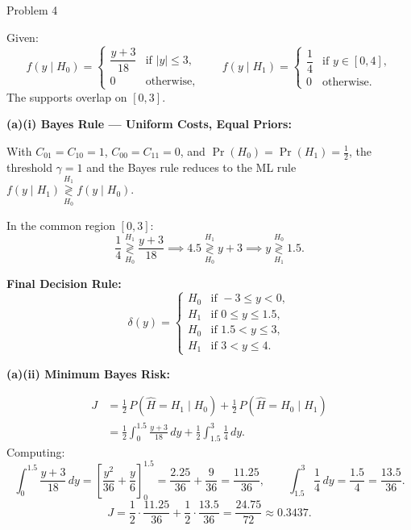 \documentclass[12pt,a4paper,onecolumn]{exam}
\newcommand{\questionheader}[1]{%
  \begin{tcolorbox}[
    enhanced,
    colback=black,
    coltext=white,
    boxrule=0pt,
    fontupper=\Large\bfseries,
    arc=4mm
  ]
  #1
  \end{tcolorbox}%
}
\begin{document}
\questionheader{Problem 4}

\begin{solution}

Given:
\[
f(y \mid H_0) = \begin{cases} \dfrac{y+3}{18} & \text{if } |y| \leq 3, \\ 0 & \text{otherwise,} \end{cases}
\qquad
f(y \mid H_1) = \begin{cases} \dfrac{1}{4} & \text{if } y \in [0,4], \\ 0 & \text{otherwise.} \end{cases}
\]
The supports overlap on $[0,3]$.

\textbf{(a)(i) Bayes Rule --- Uniform Costs, Equal Priors:}

With $C_{01}=C_{10}=1$, $C_{00}=C_{11}=0$, and $\Pr(H_0)=\Pr(H_1)=\tfrac{1}{2}$, the threshold $\gamma=1$ and the Bayes rule reduces to the ML rule $f(y\mid H_1) \underset{H_0}{\overset{H_1}{\gtrless}} f(y\mid H_0)$.

In the common region $[0,3]$:
\[
\frac{1}{4} \underset{H_0}{\overset{H_1}{\gtrless}} \frac{y+3}{18}
\implies 4.5 \underset{H_0}{\overset{H_1}{\gtrless}} y+3
\implies y \underset{H_1}{\overset{H_0}{\gtrless}} 1.5.
\]

\begin{tcolorbox}[colback=gray!10, boxrule=0.4pt]
\textbf{Final Decision Rule:}
\[
\delta(y) = \begin{cases}
H_0 & \text{if } -3 \leq y < 0, \\
H_1 & \text{if } 0 \leq y \leq 1.5, \\
H_0 & \text{if } 1.5 < y \leq 3, \\
H_1 & \text{if } 3 < y \leq 4.
\end{cases}
\]
\end{tcolorbox}

\textbf{(a)(ii) Minimum Bayes Risk:}

\begin{align*}
J &= \frac{1}{2}\,P(\hat{H}=H_1 \mid H_0) + \frac{1}{2}\,P(\hat{H}=H_0 \mid H_1) \\
&= \frac{1}{2}\int_{0}^{1.5}\frac{y+3}{18}\,dy + \frac{1}{2}\int_{1.5}^{3}\frac{1}{4}\,dy.
\end{align*}
Computing:
\[
\int_{0}^{1.5}\frac{y+3}{18}\,dy
= \left[\frac{y^2}{36}+\frac{y}{6}\right]_{0}^{1.5}
= \frac{2.25}{36}+\frac{9}{36} = \frac{11.25}{36},
\qquad
\int_{1.5}^{3}\frac{1}{4}\,dy = \frac{1.5}{4} = \frac{13.5}{36}.
\]
\[
\boxed{J = \frac{1}{2}\cdot\frac{11.25}{36} + \frac{1}{2}\cdot\frac{13.5}{36}
= \frac{24.75}{72} \approx 0.3437.}
\]


\end{solution}
\end{document}
